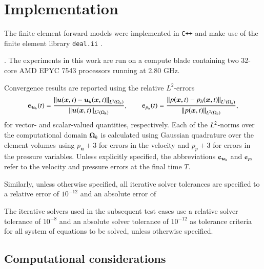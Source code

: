 

\section{Implementation}%
\label{sec:implementation_details}

The finite element forward models were implemented in \texttt{C++} and make use of the finite element library \texttt{deal.ii} \cite{dealII93}.

. 
The experiments in this work are run on a compute blade containing two 32-core AMD EPYC 7543 processors running at 2.80 GHz.

Convergence results are reported using the relative $L^2$-errors 
\begin{equation}
  \text{e}_{\bm{u}_h}(t) = \frac{ \left\lVert \bm{u}(\bm{x}, t) - \bm{u}_h(\bm{x}, t)\right\rVert_{L^2(\Omega_h)} }{ \left\lVert \bm{u}(\bm{x}, t) \right\rVert_{L^2(\Omega_h)} }, \qquad 
  \text{e}_{p_h}(t) =\frac{ \left\lVert p(\bm{x}, t) - p_h(\bm{x}, t)\right\rVert_{L^2(\Omega_h)} }{ \left\lVert p(\bm{x}, t) \right\rVert_{L^2(\Omega_h)} },
\end{equation}
for vector- and scalar-valued quantities, respectively. Each of the $L^2$-norms over the computational domain $\Omega_h$ is calculated using Gaussian quadrature over the element volumes using $p_{\bm{u}} + 3$ for errors in the velocity and $p_{p} + 3$ for errors in the pressure variables.
Unless explicitly specified, the abbreviations $\text{e}_{\bm{u}_h}$ and $\text{e}_{p_h}$ refer to the velocity and pressure errors at the final time $T$.

Similarly, unless otherwise specified, all iterative solver tolerances are specified to a relative error of $10^{-12}$ and an absolute error of 

The iterative solvers used in the subsequent test cases use a relative solver tolerance of $10^{-8}$ and an absolute solver tolerance of $10^{-12}$ as tolerance criteria for all system of equations to be solved, unless otherwise specified.


\subsection{Computational considerations}
\label{sec:computational}

